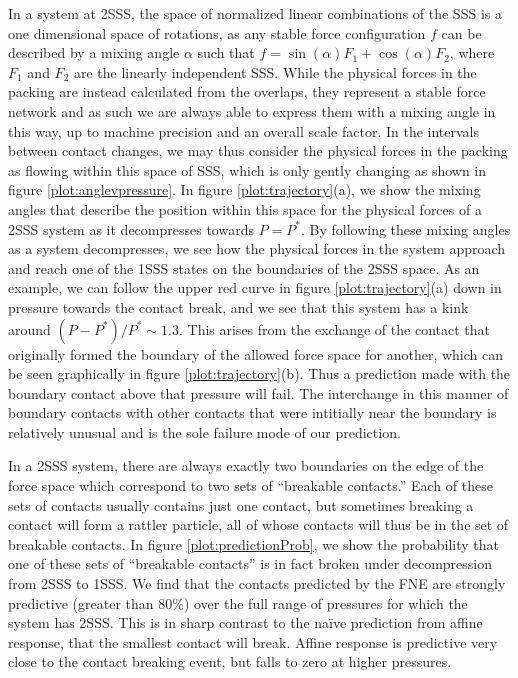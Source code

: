 In a system at 2SSS, the space of normalized linear combinations of the SSS is a one dimensional space of rotations, as any stable force configuration $f$ can be described by a mixing angle $\alpha$ such that $f = \sin(\alpha) F_1 + \cos(\alpha) F_2$, where $F_1$ and $F_2$ are the linearly independent SSS. While the physical forces in the packing are instead calculated from the overlaps, they represent a stable force network and as such we are always able to express them with a mixing angle in this way, up to machine precision and an overall scale factor. In the intervals between contact changes, we may thus consider the physical forces in the packing as flowing within this space of SSS, which is only gently changing as shown in figure \ref{plot:anglevpressure}. In figure \ref{plot:trajectory}(a), we show the mixing angles that describe the position within this space for the physical forces of a 2SSS system as it decompresses towards $P=P^*$. By following these mixing angles as a system decompresses, we see how the physical forces in the system approach and reach one of the 1SSS states on the boundaries of the 2SSS space. As an example, we can follow the upper red curve in figure \ref{plot:trajectory}(a) down in pressure towards the contact break, and we see that this system has a kink around $(P-P^*)/P^* \sim 1.3$. This arises from the exchange of the contact that originally formed the boundary of the allowed force space for another, which can be seen graphically in figure \ref{plot:trajectory}(b). Thus a prediction made with the boundary contact above that pressure will fail. The interchange in this manner of boundary contacts with other contacts that were intitially near the boundary is relatively unusual and is the sole failure mode of our prediction.




In a 2SSS system, there are always exactly two boundaries on the edge of the force space which correspond to two sets of ``breakable contacts.'' Each of these sets of contacts usually contains just one contact, but sometimes breaking a contact will form a rattler particle, all of whose contacts will thus be in the set of breakable contacts. In figure \ref{plot:predictionProb}, we show the probability that one of these sets of ``breakable contacts'' is in fact broken under decompression from 2SSS to 1SSS. We find that the contacts predicted by the FNE are strongly predictive (greater than $80\%$) over the full range of pressures for which the system has 2SSS. This is in sharp contrast to the na\"ive prediction from affine response, that the smallest contact will break. Affine response is predictive very close to the contact breaking event, but falls to zero at higher pressures.

